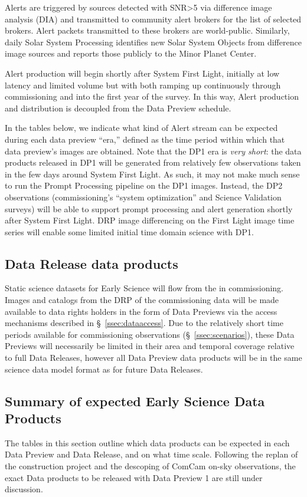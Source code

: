 Alerts are triggered by sources detected with SNR>5 via difference image analysis (DIA) and transmitted to community alert brokers for the list of selected brokers.
Alert packets transmitted to these brokers are world-public.
Similarly, daily Solar System Processing identifies new Solar System Objects from difference image sources and reports those publicly to the Minor Planet Center.

Alert production will begin shortly after System First Light, initially at low latency and limited volume but with both ramping up continuously through commissioning and into the first year of the survey.
In this way, Alert production and distribution is decoupled from the Data Preview schedule.

In the tables below, we indicate what kind of Alert stream can be expected during each data preview ``era,'' defined as the time period within which that data preview's images are obtained.
Note that the DP1 era is {\it very short}: the data products released in DP1 will be generated from relatively few observations taken in the few days around System First Light.
As such, it may not make much sense to run the Prompt Processing pipeline on the DP1 images.
Instead, the DP2 observations (commissioning's ``system optimization'' and Science Validation surveys) will be able to support prompt processing and alert generation shortly after System First Light.
DRP image differencing on the First Light image time series will enable some limited initial time domain science with DP1. 

\subsection{Data Release data products}

Static science datasets for Early Science will flow from the \svs in commissioning.
Images and catalogs from the DRP of the commissioning data will be made available to data rights holders in the form of Data Previews via the access mechanisms described in \S~\ref{ssec:dataaccess}.
Due to the relatively short time periods available for commissioning observations (\S~\ref{ssec:scenarios}), these Data Previews will necessarily be limited in their area and temporal coverage relative to full Data Releases, however all Data Preview data products will be in the same science data model format as for future Data Releases.

\subsection{Summary of expected Early Science Data Products} \label{ssec:dataproductsummary}
The tables in this section outline which data products can be expected in each Data Preview and Data Release, and on what time scale. 
Following the replan of the construction project and the descoping of ComCam on-sky observations, the exact Data products to be released with Data Preview 1 are still under discussion. 

